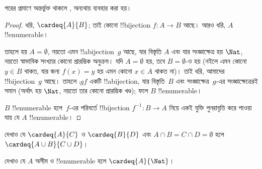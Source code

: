 \documentclass[../../../include/open-logic-section]{subfiles}
\begin{document}
\begin{editorial}
পরের প্রমাণে  অন্তর্ভুক্ত থাকলে , অন্যথায়  ব্যবহার করা হয়।
\end{editorial}

\begin{proof}
ধরি, $\cardeq{A}{B}$; তাই কোনো !!{bijection} $f \colon A
\to B$ আছে। আরও ধরি, $A$ !!{enumerable}।

{
  তাহলে হয় $A  = \emptyset$, নয়তো এমন !!a{bijection}~$g$ আছে, যার বিস্তৃতি $A$ এবং যার সংজ্ঞাক্ষেত্র হয় $\Nat$, নয়তো স্বাভাবিক সংখ্যার কোনো প্রারম্ভিক অনুক্রম। যদি $A = \emptyset$ হয়, তবে $B =
  \emptyset$-ও হয় (নইলে এমন কোনো~$y \in B$ থাকত, যার জন্য $f(x) = y$ হয় এমন কোনো $x
  \in A$ থাকত না)। তাই ধরি, আমাদের !!{bijection}~$g$ আছে। তাহলে $\comp{g}{f}$ একটি !!a{bijection}, যার বিস্তৃতি~$B$ এবং সংজ্ঞাক্ষেত্র~$g$-এর সংজ্ঞাক্ষেত্রেরই সমান (অর্থাৎ হয় $\Nat$, নয়তো তার কোনো প্রারম্ভিক খণ্ড); ফলে $B$ !!{enumerable}।}

$B$ !!{enumerable} হলে~$f$-এর পরিবর্তে !!{bijection} $f^{-1}\colon B \to A$ নিয়ে একই যুক্তি পুনরাবৃত্তি করে পাওয়া যায় যে $A$ !!{enumerable}।
\end{proof}

\begin{prob}
দেখাও যে $\cardeq{A}{C}$ ও $\cardeq{B}{D}$ এবং $A \cap B =
C \cap D = \emptyset$ হলে $\cardeq{A \cup B}{C \cup D}$।
\end{prob}

\begin{prob}
দেখাও যে $A$ অসীম ও !!{enumerable} হলে $\cardeq{A}{\Nat}$।
\end{prob}
\end{document}
